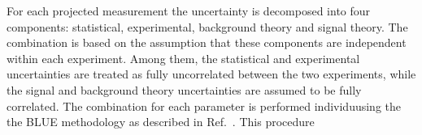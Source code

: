 For each projected measurement the uncertainty is decomposed into four components: statistical, experimental, background theory and signal theory.
The combination is based on the assumption that these components are independent within each experiment. Among them, the statistical and experimental uncertainties are treated as fully uncorrelated between the two experiments, while the signal and background theory uncertainties are assumed to be fully correlated. The combination for each parameter is performed individuusing the the BLUE methodology as described in Ref.~\cite{Valassi:2003mu}. This procedure 






